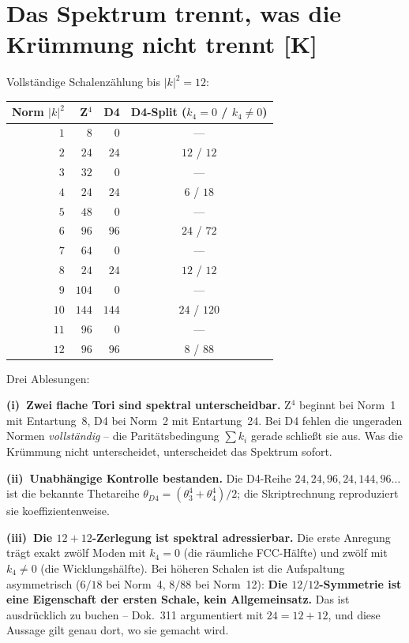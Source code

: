 \documentclass[11pt]{report}
\begin{document}
\chapter{Das Spektrum trennt, was die Krümmung nicht trennt [K]}

Vollständige Schalenzählung bis $|k|^2 = 12$:

\begin{center}
\begin{tabular}{rrrc}
\toprule
Norm $|k|^2$ & Z$^4$ & D4 & D4-Split ($k_4{=}0$ / $k_4{\ne}0$) \\
\midrule
$1$ & $8$ & $0$ & --- \\
$2$ & $24$ & $24$ & $12$ / $12$ \\
$3$ & $32$ & $0$ & --- \\
$4$ & $24$ & $24$ & $6$ / $18$ \\
$5$ & $48$ & $0$ & --- \\
$6$ & $96$ & $96$ & $24$ / $72$ \\
$7$ & $64$ & $0$ & --- \\
$8$ & $24$ & $24$ & $12$ / $12$ \\
$9$ & $104$ & $0$ & --- \\
$10$ & $144$ & $144$ & $24$ / $120$ \\
$11$ & $96$ & $0$ & --- \\
$12$ & $96$ & $96$ & $8$ / $88$ \\
\bottomrule
\end{tabular}
\end{center}

Drei Ablesungen:

\textbf{(i)~Zwei flache Tori sind spektral unterscheidbar.} Z$^4$
beginnt bei Norm~1 mit Entartung~8, D4 bei Norm~2 mit Entartung~24.
Bei D4 fehlen die ungeraden Normen \emph{vollständig} -- die
Paritätsbedingung $\sum k_i$ gerade schließt sie aus. Was die
Krümmung nicht unterscheidet, unterscheidet das Spektrum sofort.

\textbf{(ii)~Unabhängige Kontrolle bestanden.} Die D4-Reihe
$24, 24, 96, 24, 144, 96 \dots$ ist die bekannte Thetareihe
$\theta_{D4} = (\theta_3^4 + \theta_4^4)/2$; die Skriptrechnung
reproduziert sie koeffizientenweise.

\textbf{(iii)~Die $12+12$-Zerlegung ist spektral adressierbar.} Die
erste Anregung trägt exakt zwölf Moden mit $k_4 = 0$ (die räumliche
FCC-Hälfte) und zwölf mit $k_4 \ne 0$ (die Wicklungshälfte). Bei
höheren Schalen ist die Aufspaltung asymmetrisch ($6/18$ bei Norm~4,
$8/88$ bei Norm~12): \textbf{Die $12/12$-Symmetrie ist eine
Eigenschaft der ersten Schale, kein Allgemeinsatz.} Das ist
ausdrücklich zu buchen -- Dok.~311 argumentiert mit $24 = 12+12$,
und diese Aussage gilt genau dort, wo sie gemacht wird.
\end{document}
